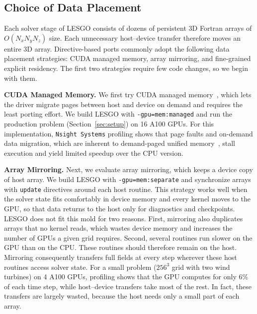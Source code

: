 \subsection{Choice of Data Placement}
\label{sec:method-placement}

Each solver stage of LESGO consists of dozens of persistent 3D Fortran
arrays of $O(N_xN_yN_z)$ size. Each
unnecessary host--device transfer therefore moves an entire 3D array.
Directive-based ports commonly adopt the following data placement
strategies: CUDA managed memory, array mirroring, and fine-grained
explicit residency. The first two strategies require few
code changes, so we begin with them.


\vspace{0.08in}
\noindent\textbf{CUDA Managed Memory.} We first try CUDA managed memory~\cite{caplan2023dc}, which
lets the driver migrate pages between host and device on demand and
requires the least porting effort. We build LESGO with
\texttt{-gpu=mem:managed} and run the production problem
(Section~\ref{sec:setup}) on 16 A100 GPUs. For this implementation,
\texttt{Nsight Systems} profiling shows that page faults and on-demand
data migration, which are inherent to demand-paged unified
memory~\cite{chien2019um}, stall execution and yield limited speedup
over the CPU version.

\vspace{0.08in}
\noindent\textbf{Array Mirroring.} Next, we evaluate array mirroring, which keeps
a device copy of host array. We build LESGO with
\texttt{-gpu=mem:separate} and synchronize arrays with \texttt{update}
directives around each host routine. This strategy works well when the
solver state fits comfortably in device memory and every kernel moves
to the GPU, so that data returns to the host only for diagnostics and
checkpoints. LESGO
does not fit this mold for two reasons. First, mirroring also
duplicates arrays that no kernel reads, which wastes device memory and
increases the number of GPUs a given grid requires. Second, several
routines run slower on the GPU than on the CPU. These routines should
therefore remain on the host.
Mirroring consequently transfers full fields at every step
wherever these host routines access solver state. 
For a small problem ($256^3$ grid with two
wind turbines) on 4 A100 GPUs, profiling shows that the
GPU computes for only 6\% of each time step, while host--device
transfers take most of the rest. In fact, these
transfers are largely wasted, because the host needs only a small part
of each array.

